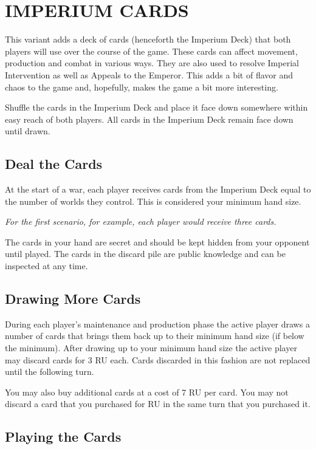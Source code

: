 \section{IMPERIUM CARDS}
\hfill

This variant adds a deck of cards (henceforth the Imperium Deck) that both players will use over the course of the game. These cards can affect movement, production and combat in various ways. They are also used to resolve Imperial Intervention as well as Appeals to the Emperor. This adds a bit of flavor and chaos to the game and, hopefully, makes the game a bit more interesting.

Shuffle the cards in the Imperium Deck and place it face down somewhere within easy reach of both players. All cards in the Imperium Deck remain face down until drawn.

\subsection{Deal the Cards}

At the start of a war, each player receives cards from the Imperium Deck equal to the number of worlds they control. This is considered your minimum hand size.

\textit{For the first scenario, for example, each player would receive three cards.}

The cards in your hand are secret and should be kept hidden from your opponent until played. The cards in the discard pile are public knowledge and can be inspected at any time.

\subsection{Drawing More Cards}

During each player's maintenance and production phase the active player draws a number of cards that brings them back up to their minimum hand size (if below the minimum). After drawing up to your minimum hand size the active player may discard cards for 3 RU each. Cards discarded in this fashion are not replaced until the following turn.

You may also buy additional cards at a cost of 7 RU per card. You may not discard a card that you purchased for RU in the same turn that you purchased it.

\subsection{Playing the Cards}

